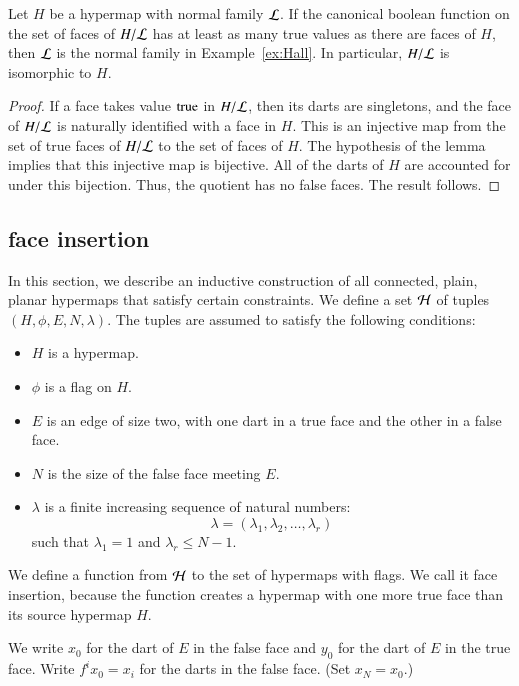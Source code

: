 \begin{lemma}\label{lemma:all-dart}  
Let $H$ be a hypermap with normal family ${\cal L}$.
If the canonical boolean function on the set of faces of
$H/{\cal L}$ has at least as many
true values as there are faces of $H$, then $\cal L$ is the normal family
in Example~\ref{ex:Hall}. In particular, $H/{\cal L}$ is isomorphic to $H$.
\end{lemma}

\begin{proof}  If a face takes value ${\operatorname{true}}$ 
in $H/{\cal L}$, then its darts are
singletons, and the face of $H/{\cal L}$ is naturally identified with
 a face in $H$.  This is an injective map from the 
set of true faces of $H/{\cal L}$ to
the set of faces of $H$.  The hypothesis of the lemma implies that this
injective map is bijective.
All of the darts of $H$ are accounted for under this bijection.
Thus, the quotient has no
false faces.  The result follows.
\end{proof}


\subsection{face insertion}


In this section, we describe an inductive construction of all
connected, plain, planar hypermaps that satisfy certain constraints.
We define a set ${\cal H}$ of tuples $(H,\phi,E,N,\lambda)$.
The tuples are assumed to satisfy the following conditions:
\begin{itemize}
    \item $H$ is a hypermap.
    \item $\phi$ is a flag on $H$.
    \item $E$ is an edge of size two, with one
    dart in a true face and the other in a false face.
    \item $N$ is the size of the false face meeting $E$.
    \item $\lambda$ is a finite increasing sequence of natural numbers:
        $$
        \lambda = (\lambda_1,\lambda_2,\ldots,\lambda_r)
        $$
    such that $\lambda_1 = 1$ and $\lambda_r \le N-1$.
\end{itemize}

We define a function from $\cal H$ to the set of hypermaps with
flags.  We call it face insertion, because the function creates a
hypermap with one more true face than its source hypermap $H$.

We write $x_0$ for the dart of $E$ in the
false face and $y_0$ for the dart of $E$ in the true face.  
Write $f^i
x_0 = x_i$ for the darts in the false face.  (Set $x_N = x_0$.)


